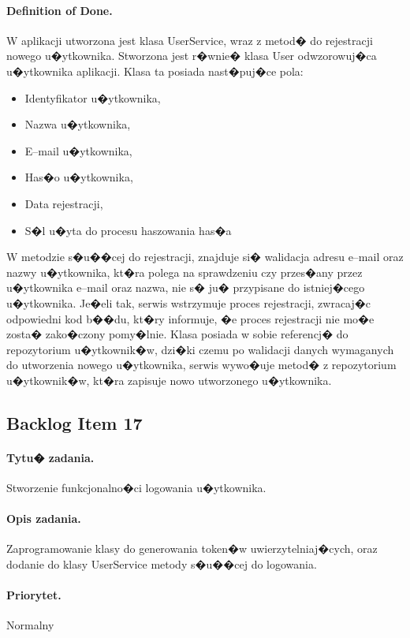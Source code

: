 ﻿\documentclass[a4paper]{article}
\begin{document}
\paragraph{Definition of Done.} W aplikacji utworzona jest klasa UserService, wraz z metod� do rejestracji nowego u�ytkownika. Stworzona jest r�wnie� klasa User odwzorowuj�ca u�ytkownika aplikacji. Klasa ta posiada nast�puj�ce pola: 
\begin{itemize}
\item Identyfikator u�ytkownika, 
\item Nazwa u�ytkownika,
\item E--mail u�ytkownika, 
\item Has�o u�ytkownika, 
\item Data rejestracji, 
\item S�l u�yta do procesu haszowania has�a
\end{itemize}
W metodzie s�u��cej do rejestracji, znajduje si� walidacja adresu e--mail oraz nazwy u�ytkownika, kt�ra polega na sprawdzeniu czy przes�any przez u�ytkownika e--mail oraz nazwa, nie s� ju� przypisane do istniej�cego u�ytkownika. Je�eli tak, serwis wstrzymuje proces rejestracji, zwracaj�c odpowiedni kod b��du, kt�ry informuje, �e proces rejestracji nie mo�e zosta� zako�czony pomy�lnie. Klasa posiada w sobie referencj� do repozytorium u�ytkownik�w, dzi�ki czemu po walidacji danych wymaganych do utworzenia nowego u�ytkownika, serwis wywo�uje metod� z repozytorium u�ytkownik�w, kt�ra zapisuje nowo utworzonego u�ytkownika. 

\subsection{Backlog Item 17} 
\paragraph{Tytu� zadania.} Stworzenie funkcjonalno�ci logowania u�ytkownika.
\paragraph{Opis zadania.} Zaprogramowanie klasy do generowania token�w uwierzytelniaj�cych, oraz dodanie do klasy UserService metody s�u��cej do logowania.
\paragraph{Priorytet.} Normalny
\end{document}
